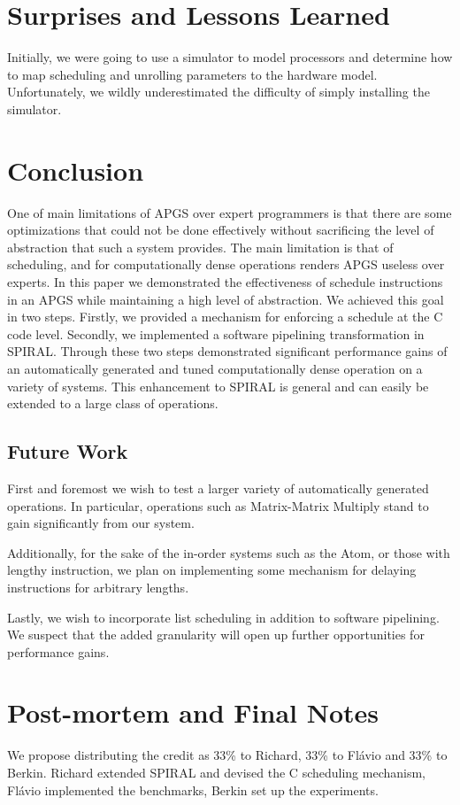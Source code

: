 \documentclass[10pt]{article}
\begin{document}
\section{Surprises and Lessons Learned}
Initially, we were going to use a simulator to model processors and determine
how to map scheduling and unrolling parameters to the hardware
model. Unfortunately, we wildly underestimated the difficulty of simply
installing the simulator.

\section{Conclusion}

One of main limitations of APGS over expert programmers is that there are some
optimizations that could not be done effectively without sacrificing the level
of abstraction that such a system provides. The main limitation is that of
scheduling, and for computationally dense operations renders APGS useless over
experts. In this paper we demonstrated the effectiveness of schedule
instructions in an APGS while maintaining a high level of abstraction. We
achieved this goal in two steps. Firstly, we provided a mechanism for enforcing
a schedule at the C code level. Secondly, we implemented a software pipelining
transformation in SPIRAL. Through these two steps demonstrated significant
performance gains of an automatically generated and tuned computationally
dense operation on a variety of systems. This enhancement to SPIRAL is general
and can easily be extended to a large class of operations.

\subsection{Future Work}
First and foremost we wish to test a larger variety of automatically generated
operations. In particular, operations such as Matrix-Matrix Multiply stand to
gain significantly from our system.

Additionally, for the sake of the in-order systems such as the Atom, or those
with lengthy instruction, we plan on implementing some mechanism for delaying
instructions for arbitrary lengths.

Lastly, we wish to incorporate list scheduling in addition to software
pipelining. We suspect that the added granularity will open up further
opportunities for performance gains.


\section{Post-mortem and Final Notes}

We propose distributing the credit as 33\% to Richard, 33\% to Flávio and 33\% to Berkin.
Richard extended SPIRAL and devised the C scheduling mechanism, Flávio
implemented the benchmarks, Berkin set up the experiments.



\end{document}
